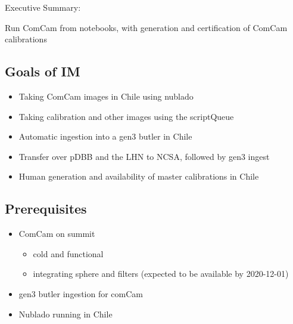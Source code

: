 
Executive Summary:

Run ComCam from notebooks, with generation and certification of ComCam calibrations

\subsection{Goals of IM}
\label{sec:orgbea7b56}
\begin{itemize}
\item Taking ComCam images in Chile using nublado
\item Taking calibration and other images using the scriptQueue
\item Automatic ingestion into a gen3 butler in Chile
\item Transfer over \gls{pDBB} and the \gls{LHN} to NCSA, followed by gen3 ingest
\item Human generation and availability of master calibrations in Chile
\end{itemize}

\subsection{Prerequisites}
\begin{itemize}
\item{ComCam on summit}
\begin{itemize}
\item cold and functional
\item integrating sphere and filters (expected to be available by 2020-12-01)
\end{itemize}
\item{gen3 butler ingestion for comCam}
\item{Nublado running in Chile}
\end{itemize}

